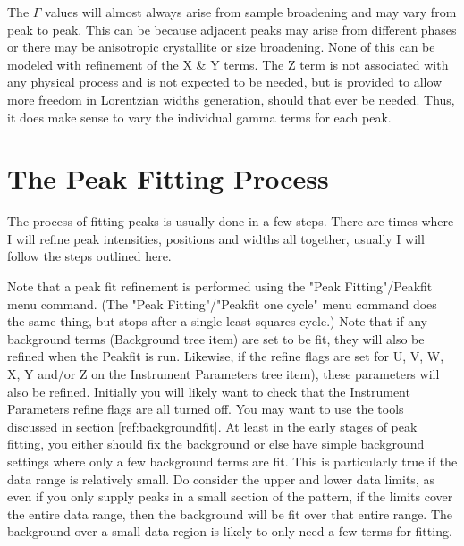 The $\Gamma$ values will almost always arise from sample broadening and may vary from peak to peak. This can be because adjacent peaks may arise from different phases or there may be anisotropic crystallite or size broadening. None of this can be modeled with refinement of the X \& Y terms. The Z term is not associated with any physical process and is not expected to be needed, but is provided to allow more freedom in Lorentzian widths generation, should that ever be needed. Thus, it does make sense to vary the individual gamma terms for each peak. 

\section{The Peak Fitting Process}\label{ref:peakparameterorder}
The process of fitting peaks is usually done in a few steps. There are times where I will refine peak intensities, positions and widths all together, usually I will follow the steps outlined here. 

Note that a peak fit refinement is performed using the "Peak Fitting"/Peakfit menu command. (The "Peak Fitting"/"Peakfit one cycle" menu command does the same thing, but stops after a single least-squares cycle.) Note that if any background terms (Background tree item) are set to be fit, they will also be refined when the Peakfit is run. Likewise, if the refine flags are set for U, V, W, X, Y and/or Z on the Instrument Parameters tree item), these parameters will also be refined. Initially you will likely want to check that the Instrument Parameters refine flags are all turned off. You may want to use the tools discussed in section \ref{ref:backgroundfit}. At least in the early stages of peak fitting, you either should fix the background or else have simple background settings where only a few background terms are fit. This is particularly true if the data range is relatively small. Do consider the upper and lower data limits, as even if you only supply peaks in a small section of the pattern, if the limits cover the entire data range, then the background will be fit over that entire range. The background over a small data region is likely to only need a few terms for fitting. 

